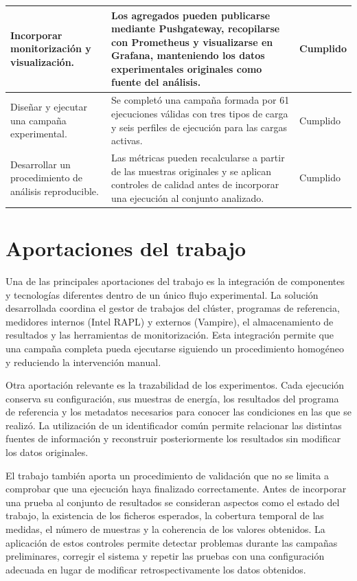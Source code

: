 \begin{longtable}{|p{}|p{}|p{}|}
    Incorporar monitorización y visualización. &
    Los agregados pueden publicarse mediante Pushgateway, recopilarse con Prometheus y visualizarse en Grafana, manteniendo los datos experimentales originales como fuente del análisis. &
    Cumplido \\
    \hline

    Diseñar y ejecutar una campaña experimental. &
    Se completó una campaña formada por 61 ejecuciones válidas con tres tipos de carga y seis perfiles de ejecución para las cargas activas. &
    Cumplido \\
    \hline

    Desarrollar un procedimiento de análisis reproducible. &
    Las métricas pueden recalcularse a partir de las muestras originales y se aplican controles de calidad antes de incorporar una ejecución al conjunto analizado. &
    Cumplido \\
    \hline

\end{longtable}
\endgroup

\section{Aportaciones del trabajo}
\label{sec:aportaciones}

Una de las principales aportaciones del trabajo es la integración de componentes y tecnologías diferentes dentro de un único flujo experimental. La solución desarrollada coordina el gestor de trabajos del clúster, programas de referencia, medidores internos (Intel RAPL) y externos (Vampire), el almacenamiento de resultados y las herramientas de monitorización. Esta integración permite que una campaña completa pueda ejecutarse siguiendo un procedimiento homogéneo y reduciendo la intervención manual.

Otra aportación relevante es la trazabilidad de los experimentos. Cada ejecución conserva su configuración, sus muestras de energía, los resultados del programa de referencia y los metadatos necesarios para conocer las condiciones en las que se realizó. La utilización de un identificador común permite relacionar las distintas fuentes de información y reconstruir posteriormente los resultados sin modificar los datos originales.

El trabajo también aporta un procedimiento de validación que no se limita a comprobar que una ejecución haya finalizado correctamente. Antes de incorporar una prueba al conjunto de resultados se consideran aspectos como el estado del trabajo, la existencia de los ficheros esperados, la cobertura temporal de las medidas, el número de muestras y la coherencia de los valores obtenidos. La aplicación de estos controles permite detectar problemas durante las campañas preliminares, corregir el sistema y repetir las pruebas con una configuración adecuada en lugar de modificar retrospectivamente los datos obtenidos.

